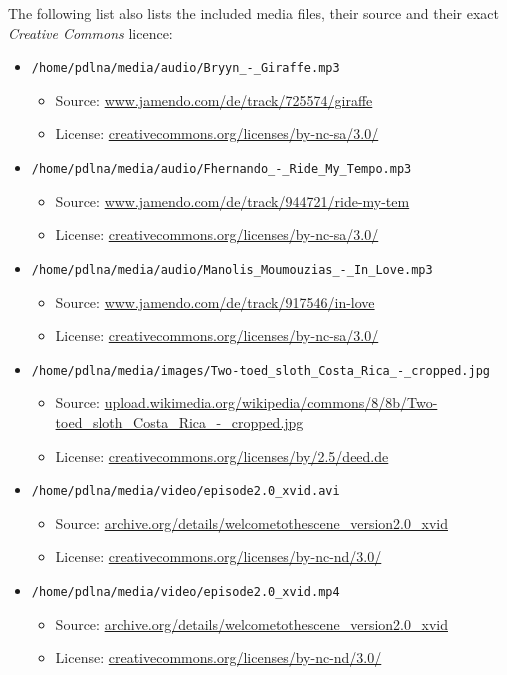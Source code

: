 \documentclass[a4paper,oneside,10pt]{report}
\begin{document}
The following list also lists the included media files, their source and their exact {\em Creative Commons} licence:
\begin{itemize}
	\item \verb|/home/pdlna/media/audio/Bryyn_-_Giraffe.mp3|
	\begin{itemize}
		\item Source: \url{www.jamendo.com/de/track/725574/giraffe}
		\item License: \url{creativecommons.org/licenses/by-nc-sa/3.0/}
	\end{itemize}
	\item \verb|/home/pdlna/media/audio/Fhernando_-_Ride_My_Tempo.mp3|
	\begin{itemize}
		\item Source: \url{www.jamendo.com/de/track/944721/ride-my-tem}
		\item License: \url{creativecommons.org/licenses/by-nc-sa/3.0/}
	\end{itemize}
	\item \verb|/home/pdlna/media/audio/Manolis_Moumouzias_-_In_Love.mp3|
	\begin{itemize}
		\item Source: \url{www.jamendo.com/de/track/917546/in-love}
		\item License: \url{creativecommons.org/licenses/by-nc-sa/3.0/}
	\end{itemize}
	\item \verb|/home/pdlna/media/images/Two-toed_sloth_Costa_Rica_-_cropped.jpg|
	\begin{itemize}
		\item Source: \url{upload.wikimedia.org/wikipedia/commons/8/8b/Two-toed_sloth_Costa_Rica_-_cropped.jpg}
		\item License: \url{creativecommons.org/licenses/by/2.5/deed.de}
	\end{itemize}
	\item \verb|/home/pdlna/media/video/episode2.0_xvid.avi|
	\begin{itemize}
		\item Source: \url{archive.org/details/welcometothescene_version2.0_xvid}
		\item License: \url{creativecommons.org/licenses/by-nc-nd/3.0/}
	\end{itemize}
	\item \verb|/home/pdlna/media/video/episode2.0_xvid.mp4|
	\begin{itemize}
		\item Source: \url{archive.org/details/welcometothescene_version2.0_xvid}
		\item License: \url{creativecommons.org/licenses/by-nc-nd/3.0/}
	\end{itemize}
\end{itemize}
\end{document}
